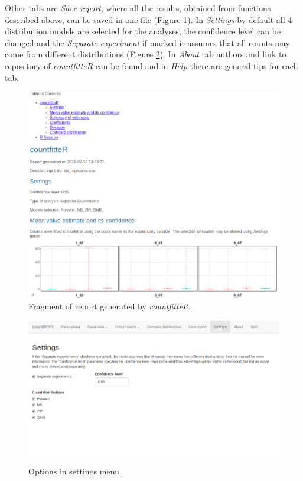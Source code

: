 Other tabs are \textit{Save report}, where all the results, obtained from functions described above, can be saved in one file (Figure \ref{cj_rep}). In \textit{Settings} by default all 4 distribution models are selected for the analyses, the confidence level can be changed and the \textit{Separate experiment} if marked it assumes that all counts may come from different distributions (Figure \ref{cj_set}). In \textit{About} tab authors and link to repository of \emph{countfitteR} can be found and in \textit{Help} there are general tips for each tab. 

\begin{figure}[htbp]
  \centering
  \includegraphics[width=0.99\columnwidth]{cj_rep}
  \caption{Fragment of report generated by \emph{countfitteR}.}
  \label{cj_rep}
\end{figure}

\begin{figure}[htbp]
  \centering
  \includegraphics[width=0.99\columnwidth]{fig/cf_set.png}
  \caption{Options in settings menu.}
  \label{cj_set}
\end{figure}

